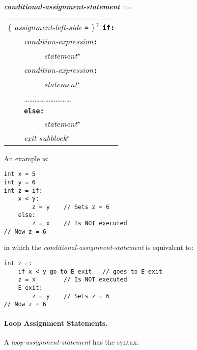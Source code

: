 \documentclass[12pt]{article}
\newcommand{\subsubsubsection}[1]{\paragraph[#1]{#1.}}
\newcommand{\TT}[1]{{\tt \bfseries #1}}
\newcommand{\STAR}{{\Large $^\star$}}
\newcommand{\QMARK}{{$^{\,\mbox{\footnotesize ?}}$}}
\newcommand{\ttkey}[1]{{\tt \bfseries #1}}
\newcommand{\emkey}[1]{{\em \bfseries #1}}
\newenvironment{indpar}[1][0.3in]%
	{\begin{list}{}%
		     {\setlength{\itemsep}{0in}%
		      \setlength{\topsep}{0in}%
		      \setlength{\parsep}{1ex}%
		      \setlength{\labelwidth}{#1}%
		      \setlength{\leftmargin}{#1}%
		      \addtolength{\leftmargin}{\labelsep}}%
	 \item}%
	{\end{list}}
\begin{document}
\begin{indpar}
\emkey{conditional-assignment-statement} ::= \\
\hspace*{0.5in}\begin{tabular}[t]{l}
        \{ {\em assignment-left-side} \TT{=} \}\QMARK{} \ttkey{if}\TT{:} \\
	\TT{~~~~}{\em condition-expression}\TT{:} \\
	\TT{~~~~~~~~~}{\em statement}\STAR{} \\
	\TT{~~~~}{\em condition-expression}\TT{:} \\
	\TT{~~~~~~~~~}{\em statement}\STAR{} \\
	\TT{~~~~}\ldots\ldots\ldots\ldots\ldots\ldots\ldots\ldots\ldots \\
	\TT{~~~~}\ttkey{else}\TT{:} \\
	\TT{~~~~~~~~~}{\em statement}\STAR{} \\
	\TT{~~~~}{\em exit subblock}\STAR{}
	\end{tabular}
\end{indpar}

An example is:
\begin{indpar}\begin{verbatim}
int x = 5
int y = 6
int z = if:
    x < y:
        z = y    // Sets z = 6
    else:
        z = x    // Is NOT executed
// Now z = 6
\end{verbatim}\end{indpar}
in which the {\em conditional-assignment-statement} is equivalent to:
\begin{indpar}\begin{verbatim}
int z =:
    if x < y go to E exit   // goes to E exit
    z = x        // Is NOT executed
    E exit:
        z = y    // Sets z = 6
// Now z = 6
\end{verbatim}\end{indpar}

\subsubsubsection{Loop Assignment Statements}
\label{LOOP-ASSIGNMENT-STATEMENTS}

A {\em loop-assignment-statement} has the syntax:
\end{document}
